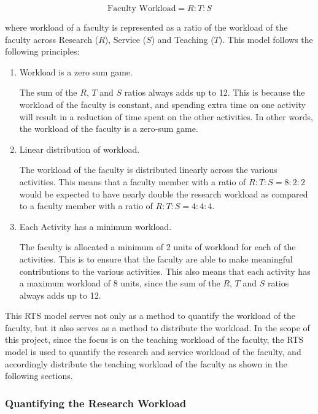 \begin{equation*}
  \text{Faculty Workload} = R:T:S
\end{equation*}

where workload of a faculty is represented as a ratio of the workload of the faculty across Research ($R$), Service ($S$) and Teaching ($T$). This model follows the following principles:

\begin{enumerate}
  \item Workload is a zero sum game.

        The sum of the $R$, $T$ and $S$ ratios always adds up to 12. This is because the workload of the faculty is constant, and spending extra time on one activity will result in a reduction of time spent on the other activities. In other words, the workload of the faculty is a zero-sum game.

  \item Linear distribution of workload.

        The workload of the faculty is distributed linearly across the various activities. This means that a faculty member with a ratio of $R:T:S = 8:2:2$ would be expected to have nearly double the research workload as compared to a faculty member with a ratio of $R:T:S = 4:4:4$.

  \item Each Activity has a minimum workload.

        The faculty is allocated a minimum of 2 units of workload for each of the activities. This is to ensure that the faculty are able to make meaningful contributions to the various activities. This also means that each activity has a maximum workload of 8 units, since the sum of the $R$, $T$ and $S$ ratios always adds up to 12.

\end{enumerate}

This RTS model serves not only as a method to quantify the workload of the faculty, but it also serves as a method to distribute the workload. In the scope of this project, since the focus is on the teaching workload of the faculty, the RTS model is used to quantify the research and service workload of the faculty, and accordingly distribute the teaching workload of the faculty as shown in the following sections.

\subsubsection{Quantifying the Research Workload}


